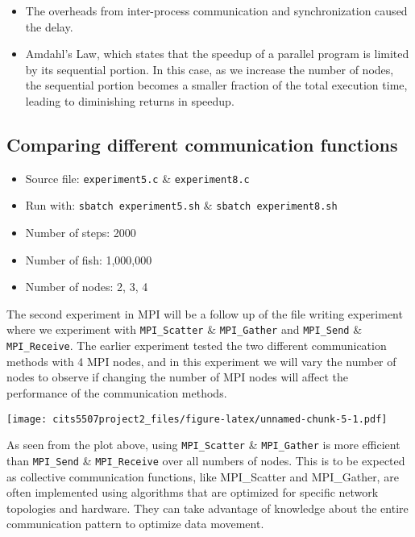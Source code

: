 \documentclass[
]{article}
\providecommand{\tightlist}{%
  \setlength{\itemsep}{0pt}\setlength{\parskip}{0pt}}
\begin{document}
\begin{itemize}
\item
  The overheads from inter-process communication and synchronization
  caused the delay.
\item
  Amdahl's Law, which states that the speedup of a parallel program is
  limited by its sequential portion. In this case, as we increase the
  number of nodes, the sequential portion becomes a smaller fraction of
  the total execution time, leading to diminishing returns in speedup.
\end{itemize}

\hypertarget{comparing-different-communication-functions}{%
\subsection{Comparing different communication
functions}\label{comparing-different-communication-functions}}

\begin{itemize}
\tightlist
\item
  Source file: \texttt{experiment5.c} \& \texttt{experiment8.c}
\item
  Run with: \texttt{sbatch\ experiment5.sh} \&
  \texttt{sbatch\ experiment8.sh}
\item
  Number of steps: 2000
\item
  Number of fish: 1,000,000
\item
  Number of nodes: 2, 3, 4
\end{itemize}

The second experiment in MPI will be a follow up of the file writing
experiment where we experiment with \texttt{MPI\_Scatter} \&
\texttt{MPI\_Gather} and \texttt{MPI\_Send} \& \texttt{MPI\_Receive}.
The earlier experiment tested the two different communication methods
with 4 MPI nodes, and in this experiment we will vary the number of
nodes to observe if changing the number of MPI nodes will affect the
performance of the communication methods.

\texttt{[image: cits5507project2\_files/figure-latex/unnamed-chunk-5-1.pdf]}

As seen from the plot above, using \texttt{MPI\_Scatter} \&
\texttt{MPI\_Gather} is more efficient than \texttt{MPI\_Send} \&
\texttt{MPI\_Receive} over all numbers of nodes. This is to be expected
as collective communication functions, like MPI\_Scatter and
MPI\_Gather, are often implemented using algorithms that are optimized
for specific network topologies and hardware. They can take advantage of
knowledge about the entire communication pattern to optimize data
movement.
\end{document}
